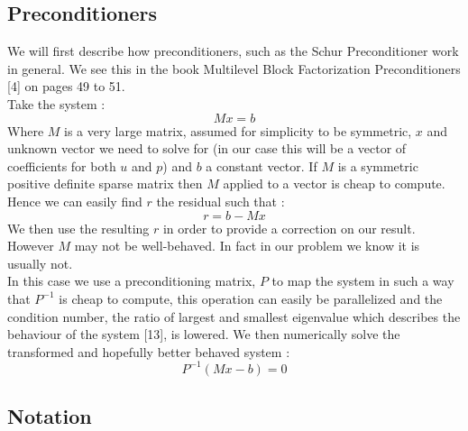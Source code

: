 \documentclass[11pt,twoside,a4paper]{article}
\begin{document}
\subsection{Preconditioners}

We will first describe how preconditioners, such as the Schur Preconditioner work in general. We see this in the book Multilevel Block Factorization Preconditioners [4] on pages 49 to 51.\\
Take the system :\\
$$
Mx = b
$$
Where $M$ is a very large matrix, assumed for simplicity to be symmetric, $x$ and unknown vector we need to solve for (in our case this will be a vector of coefficients for both $u$ and $p$) and $b$ a constant vector. If $M$ is a symmetric positive definite sparse matrix then $M$ applied to a vector is cheap to compute. Hence we can easily find $r$ the residual such that :\\
$$
r = b - Mx
$$
We then use the resulting $r$ in order to provide a correction on our result.\\
However $M$ may not be well-behaved. In fact in our problem we know it is usually not.\\
In this case we use a preconditioning matrix, $P$ to map the system in such a way that $P^{-1}$ is cheap to compute, this operation can easily be parallelized and the condition number, the ratio of largest and smallest eigenvalue which describes the behaviour of the system [13], is lowered.
We then numerically solve the transformed and hopefully better behaved system : 
$$
P^{-1}(Mx-b) = 0
$$ 

\subsection{Notation}
\end{document}
